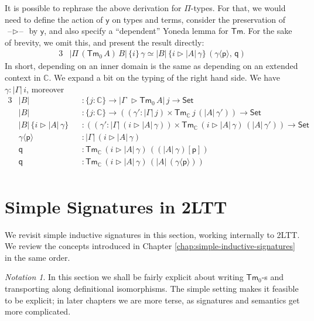 \documentclass[12pt,a4paper,twoside,openany]{book}
\theoremstyle{remark}
\newtheorem{notation}{Notation}
\theoremstyle{definition}
\theoremstyle{theorem}
\newcommand{\ms}[1]{\mathsf{#1}}
\newcommand{\mbb}[1]{\mathbb{#1}}
\newcommand{\Tm}{\mathsf{Tm}}
\newcommand{\blank}{\mathord{\hspace{1pt}\text{--}\hspace{1pt}}}
\newcommand{\Set}{\mathsf{Set}}
\newcommand{\ext}{\triangleright}
\newcommand{\p}{\mathsf{p}}
\newcommand{\q}{\mathsf{q}}
\newcommand{\mbbC}{\mbb{C}}
\newcommand{\lab}{\langle}
\newcommand{\rab}{\rangle}
\newcommand{\yon}{\ms{y}}
\begin{document}
It is possible to rephrase the above derivation for $\Pi$-types. For that, we
would need to define the action of $\yon$ on types and terms, consider the
preservation of $\blank\ext\blank$ by $\yon$, and also specify a ``dependent''
Yoneda lemma for $\Tm$. For the sake of brevity, we omit this, and present the
result directly:
\begin{alignat*}{3}
  & |\Pi\,(\Tm_0\,A)\,B|\,\{i\}\,\gamma \simeq |B|\,\{i \ext |A|\,\gamma\}\,(\gamma \lab \p \rab,\,\q)
\end{alignat*}
In short, depending on an inner domain is the same as depending on an extended
context in $\mbbC$.  We expand a bit on the typing of the right hand side. We
have $\gamma : |\Gamma|\,i$, moreover
\begingroup
\allowdisplaybreaks
\begin{alignat*}{3}
  & |B| &&: \{j : \mbbC\} \to |\Gamma\,\,\ext \Tm_0\,A|\,j \to \Set\\
  & |B| &&: \{j : \mbbC\} \to ((\gamma' : |\Gamma|\,j)\times \Tm_{\mbbC}\,j\,(|A|\,\gamma')) \to \Set\\
  & |B|\,\{i \ext |A|\,\gamma\} &&: ((\gamma' : |\Gamma|\,(i \ext |A|\,\gamma))\times \Tm_{\mbbC}\,(i \ext |A|\,\gamma)\,(|A|\,\gamma')) \to \Set\\
  & \gamma \lab \p \rab &&: |\Gamma|\,(i \ext |A|\,\gamma)\\
  & \q &&: \Tm_{\mbbC}\,(i \ext |A|\,\gamma)\,((|A|\,\gamma)[\p])\\
  & \q &&: \Tm_{\mbbC}\,(i \ext |A|\,\gamma)\,(|A|\,(\gamma \lab \p \rab))\\
\end{alignat*}
\endgroup

\section{Simple Signatures in 2LTT}
\label{sec:2ltt-simple-signatures}

We revisit simple inductive signatures in this section, working internally to
2LTT. We review the concepts introduced in Chapter
\ref{chap:simple-inductive-signatures} in the same order.

\begin{notation}
In this section we shall be fairly explicit about writing $\Tm_0$-s and
transporting along definitional isomorphisms. The simple setting makes it
feasible to be explicit; in later chapters we are more terse, as signatures and
semantics get more complicated.
\end{notation}
\end{document}
